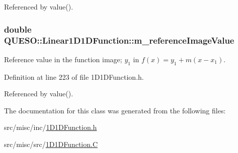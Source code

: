 Referenced by value().

\hypertarget{class_q_u_e_s_o_1_1_linear1_d1_d_function_abb210b107ac3ad9473b8c597808b1ba9}{
\subsubsection[{m\-\_\-reference\-Image\-Value}]{\setlength{\rightskip}{0pt plus 5cm}double Q\-U\-E\-S\-O\-::\-Linear1\-D1\-D\-Function\-::m\-\_\-reference\-Image\-Value\hspace{0.3cm}{\ttfamily [protected]}}}\label{class_q_u_e_s_o_1_1_linear1_d1_d_function_abb210b107ac3ad9473b8c597808b1ba9}


Reference value in the function image; $ y_1 $ in $ f(x) = y_1 + m (x - x_1)$. 



Definition at line 223 of file 1\-D1\-D\-Function.\-h.



Referenced by value().



The documentation for this class was generated from the following files\-:\begin{DoxyCompactItemize}
\item 
src/misc/inc/\hyperlink{1_d1_d_function_8h}{1\-D1\-D\-Function.\-h}\item 
src/misc/src/\hyperlink{1_d1_d_function_8_c}{1\-D1\-D\-Function.\-C}\end{DoxyCompactItemize}
